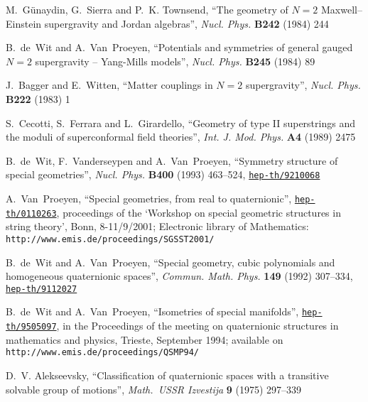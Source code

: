 \documentclass[a4paper,11pt,twoside]{article}
\begin{document}
\begin{thebibliography}{10}
{\sc M.~G{\"u}naydin, G.~Sierra  and P.~K. Townsend}, ``The geometry of $N=2$
  Maxwell--Einstein supergravity and Jordan algebras'',  {\sl Nucl. Phys.} {\bf
  B242} (1984)
244

{\sc B.~de~Wit and A.~Van~Proeyen}, ``Potentials and symmetries of
general
  gauged $N=2$ supergravity -- Yang-Mills models'',  {\sl Nucl. Phys.} {\bf
  B245} (1984)
89

{\sc J.~Bagger and E.~Witten}, ``Matter couplings in $N=2$
supergravity'',
  {\sl Nucl. Phys.} {\bf B222} (1983)
1

{\sc S.~Cecotti, S.~Ferrara  and L.~Girardello}, ``Geometry of type II
  superstrings and the moduli of superconformal field theories'',  {\sl Int. J.
  Mod. Phys.} {\bf A4} (1989)
2475

{\sc B.~de~Wit, F.~Vanderseypen  and A.~Van~Proeyen}, ``Symmetry
structure of
  special geometries'',  {\sl Nucl. Phys.} {\bf B400} (1993) 463--524,
\href{http://www.arXiv.org/abs/hep-th/9210068}{{\tt hep-th/9210068}}

{\sc A.~Van~Proeyen}, ``Special geometries, from real to quaternionic'',
  \href{http://arXiv.org/abs/hep-th/0110263}{{\tt hep-th/0110263}},
proceedings of the `Workshop on special geometric structures in string
theory',
  Bonn, 8-11/9/2001; Electronic library of Mathematics:
  \texttt{http://www.emis.de/proceedings/SGSST2001/}

{\sc B.~de~Wit and A.~Van~Proeyen}, ``Special geometry, cubic polynomials
and
  homogeneous quaternionic spaces'',  {\sl Commun. Math. Phys.} {\bf 149}
  (1992) 307--334,
\href{http://arXiv.org/abs/hep-th/9112027}{{\tt hep-th/9112027}}

{\sc B.~de~Wit and A.~Van~Proeyen}, ``Isometries of special manifolds'',
  \href{http://www.arXiv.org/abs/hep-th/9505097}{{\tt hep-th/9505097}},
in the Proceedings of the meeting on quaternionic structures in
mathematics and
  physics, Trieste, September 1994; available on
  \verb+http://www.emis.de/proceedings/QSMP94/+

{\sc D.~V. Alekseevsky}, ``Classification of quaternionic spaces with a
  transitive solvable group of motions'',  {\sl Math.\ USSR Izvestija} {\bf 9}
  (1975)
297--339


\end{thebibliography}
\end{document}
